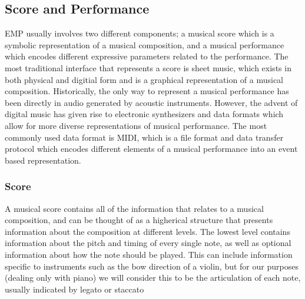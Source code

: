 
\subsection{Score and Performance}
EMP usually involves two different components; a musical score which is a symbolic representation of a musical composition, and a musical performance which encodes different expressive parameters related to the performance. The most traditional interface that represents a score is sheet music, which exists in both physical and digitial form and is a graphical representation of a musical composition. Historically, the only way to represent a musical performance has been directly in audio generated by acoustic instruments. However, the advent of digital music has given rise to electronic synthesizers and data formats which allow for more diverse representations of musical performance. The most commonly used data format is MIDI, which is a file format and data transfer protocol which encodes different elements of a musical performance into an event based representation. 

\subsubsection{Score}

A musical score contains all of the information that relates to a musical composition, and can be thought of as a higherical structure that presents information about the composition at different levels. The lowest level contains information about the pitch and timing of every single note, as well as optional information about how the note should be played. This can include information specific to instruments such as the bow direction of a violin, but for our purposes (dealing only with piano) we will consider this to be the articulation of each note, usually indicated by legato or staccato 

